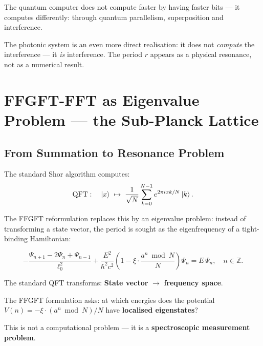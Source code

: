 \begin{keypoint}
The quantum computer does not compute faster by
having faster bits --- it computes differently:
through quantum parallelism, superposition and interference.

The photonic system is an even more direct realisation:
it does not \emph{compute} the interference ---
it \emph{is} interference.
The period $r$ appears as a physical resonance,
not as a numerical result.
\end{keypoint}

\section{FFGFT-FFT as Eigenvalue Problem ---
  the Sub-Planck Lattice}
\label{sec:ffgft-eigen}

\subsection{From Summation to Resonance Problem}

The standard Shor algorithm computes:
\begin{equation}
  \text{QFT}: \quad \left|x\right\rangle \;\mapsto\;
  \frac{1}{\sqrt{N}}\sum_{k=0}^{N-1} e^{2\pi i xk/N}\left|k\right\rangle.
\end{equation}

The FFGFT reformulation replaces this by an eigenvalue problem:
instead of transforming a state vector,
the period is sought as the eigenfrequency of a
tight-binding Hamiltonian:

\begin{equation}
  \label{eq:t0-discrete}
  -\frac{\Psi_{n+1} - 2\Psi_n + \Psi_{n-1}}{\ell_0^2}
  + \frac{E^2}{\hbar^2 c^2}
  \left(1 - \xi \cdot \frac{a^n \bmod N}{N}\right)\Psi_n
  = E\,\Psi_n,
  \quad n \in \mathbb{Z}.
\end{equation}

\begin{keypoint}
The standard QFT transforms:
\textbf{State vector} $\to$ \textbf{frequency space}.

The FFGFT formulation asks:
at which energies does the potential
$V(n) = -\xi \cdot (a^n \bmod N)/N$
have \textbf{localised eigenstates}?

This is not a computational problem ---
it is a \textbf{spectroscopic measurement problem}.
\end{keypoint}

